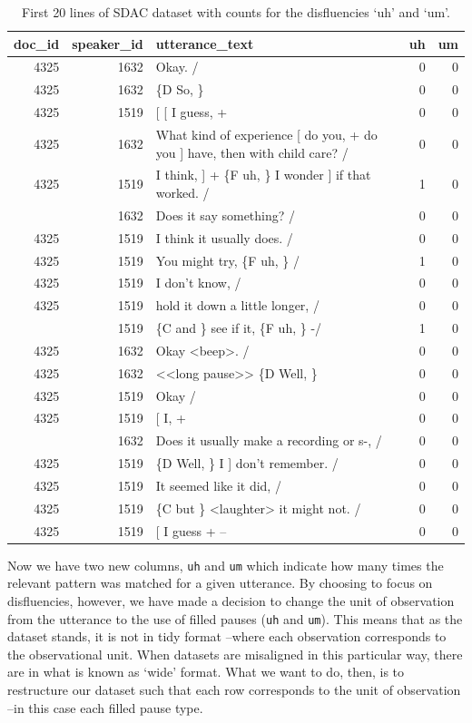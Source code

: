 \documentclass[
  letterpaper,
]{latex/krantz}
\begin{document}
\hypertarget{tbl-td-sdac-count-disfluencies-show}{}
\begin{table}
\caption{\label{tbl-td-sdac-count-disfluencies-show}First 20 lines of SDAC dataset with counts for the disfluencies `uh' and
`um'. }\tabularnewline

\centering
\begin{tabular}{rrlrr}
\toprule
doc\_id & speaker\_id & utterance\_text & uh & um\\
\midrule
4325 & 1632 & Okay.  / & 0 & 0\\
4325 & 1632 & \{D So, \} & 0 & 0\\
4325 & 1519 & {}[ [ I guess, + & 0 & 0\\
4325 & 1632 & What kind of experience [ do you, + do you ] have, then with child care? / & 0 & 0\\
4325 & 1519 & I think, ] + \{F uh, \} I wonder ] if that worked. / & 1 & 0\\
\addlinespace
4325 & 1632 & Does it say something? / & 0 & 0\\
4325 & 1519 & I think it usually does.  / & 0 & 0\\
4325 & 1519 & You might try, \{F uh, \}  / & 1 & 0\\
4325 & 1519 & I don't know,  / & 0 & 0\\
4325 & 1519 & hold it down a little longer,  / & 0 & 0\\
\addlinespace
4325 & 1519 & \{C and \} see if it, \{F uh, \} -/ & 1 & 0\\
4325 & 1632 & Okay <beep>.  / & 0 & 0\\
4325 & 1632 & <<long pause>> \{D Well, \} & 0 & 0\\
4325 & 1519 & Okay  / & 0 & 0\\
4325 & 1519 & {}[ I, + & 0 & 0\\
\addlinespace
4325 & 1632 & Does it usually make a recording or s-, / & 0 & 0\\
4325 & 1519 & \{D Well, \} I ] don't remember.  / & 0 & 0\\
4325 & 1519 & It seemed like it did,  / & 0 & 0\\
4325 & 1519 & \{C but \} <laughter> it might not.  / & 0 & 0\\
4325 & 1519 & {}[ I guess + -- & 0 & 0\\
\bottomrule
\end{tabular}
\end{table}

Now we have two new columns, \texttt{uh} and \texttt{um} which indicate
how many times the relevant pattern was matched for a given utterance.
By choosing to focus on disfluencies, however, we have made a decision
to change the unit of observation from the utterance to the use of
filled pauses (\texttt{uh} and \texttt{um}). This means that as the
dataset stands, it is not in tidy format --where each observation
corresponds to the observational unit. When datasets are misaligned in
this particular way, there are in what is known as `wide' format. What
we want to do, then, is to restructure our dataset such that each row
corresponds to the unit of observation --in this case each filled pause
type.
\end{document}
